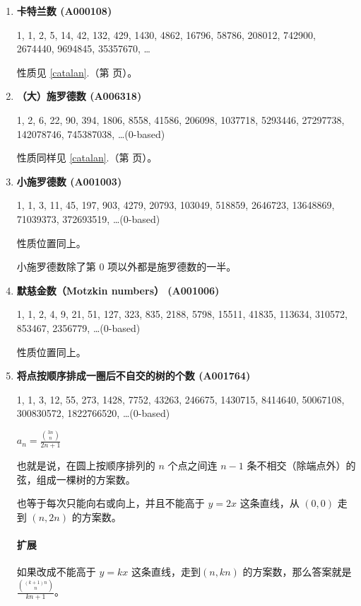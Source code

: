 \documentclass[a4paper, twoside]{article}
\newcommand\detailedref[1]{\ref{#1}.\nameref{#1}（第 \pageref{#1} 页）}
\begin{document}
    \begin{enumerate}

        \item \textbf{卡特兰数 (A000108)}

        1, 1, 2, 5, 14, 42, 132, 429, 1430, 4862, 16796, 58786, 208012, 742900, 2674440, 9694845, 35357670, \dots

        性质见 \detailedref{catalan}。 

        \item \textbf{（大）施罗德数 (A006318)}

        1, 2, 6, 22, 90, 394, 1806, 8558, 41586, 206098, 1037718, 5293446, 27297738, 142078746, 745387038, \dots \;(0-based)

        性质同样见 \detailedref{catalan}。

        \item \textbf{小施罗德数 (A001003)}

        1, 1, 3, 11, 45, 197, 903, 4279, 20793, 103049, 518859, 2646723, 13648869, 71039373, 372693519, \dots \;(0-based)

        性质位置同上。

        小施罗德数除了第 $0$ 项以外都是施罗德数的一半。

        \item \textbf{默慈金数（Motzkin numbers） (A001006)}

        1, 1, 2, 4, 9, 21, 51, 127, 323, 835, 2188, 5798, 15511, 41835, 113634, 310572, 853467, 2356779, \dots \;(0-based)

        性质位置同上。

        \item \textbf{将点按顺序排成一圈后不自交的树的个数 (A001764)}

        1, 1, 3, 12, 55, 273, 1428, 7752, 43263, 246675, 1430715, 8414640, 50067108, 300830572, 1822766520, \dots \;(0-based)

        $ a_n = \frac {\binom{3n}{n}}{2n + 1} $

        也就是说，在圆上按顺序排列的 $n$ 个点之间连 $n - 1$ 条不相交（除端点外）的弦，组成一棵树的方案数。

        也等于每次只能向右或向上，并且不能高于 $y = 2x$ 这条直线，从 $(0, 0)$ 走到 $(n, 2n)$ 的方案数。

        \paragraph{扩展} 如果改成不能高于 $y = kx$ 这条直线，走到$(n, kn)$ 的方案数，那么答案就是$ \frac {\binom{(k+1)n}{n}} {kn + 1} $。


\end{enumerate}
\end{document}
